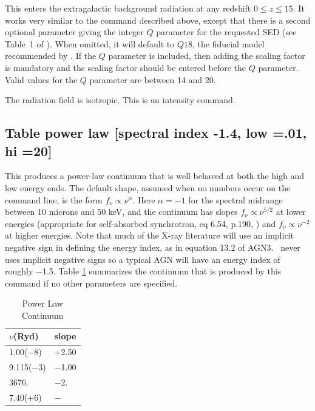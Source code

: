 This enters the \citet{KhaireSrianand2019} extragalactic background radiation
at any redshift $0 \le z \le 15$. It works very similar to the
 command described above, except that there is a second
optional parameter giving the integer $Q$ parameter for the requested SED (see
Table~1 of \citealp{KhaireSrianand2019}). When omitted, it will default to
$Q18$, the fiducial model recommended by \citet{KhaireSrianand2019}. If the
$Q$ parameter is included, then adding the scaling factor is mandatory and the
scaling factor should be entered before the $Q$ parameter. Valid values for
the $Q$ parameter are between 14 and 20.

The radiation field is isotropic. This is an intensity command.

\subsection{Table power law [spectral index -1.4, low =.01, hi =20] }

This produces a power-law continuum that is well behaved at both the
high and low energy ends.
The default shape, assumed when no numbers occur
on the command line, is the form $f_\nu   \propto \nu ^\alpha  $.
Here
$\alpha = -1$ for the spectral midrange between 10 microns and 50 keV,
and the continuum has slopes $f_\nu   \propto \nu ^{5/2} $ at lower energies (appropriate for self-absorbed synchrotron, eq 6.54,
p.190, \citealp{Rybicki1979}) and
$f_\nu   \propto \nu ^{ - 2} $ at higher energies.
Note that much of the X-ray literature will use
an implicit negative sign in defining the energy index,
as in equation 13.2 of AGN3.
\Cloudy\ never uses implicit negative signs so a typical AGN will
have an energy index of roughly $-$1.5.
Table \ref{tab:PowerLawContinuum} summarizes the continuum
that is produced by this command if no other parameters are specified.

\begin{table}
\centering
\caption{Power Law Continuum}
\begin{tabular}{ll}\hline
\label{tab:PowerLawContinuum}
$\nu$(Ryd)& slope\\
\hline
1.00($-$8)& $+$2.50\\
9.115($-$3)& $-$1.00\\
3676.& $-$2.\\
7.40($+$6)& $-$\\
\hline
\end{tabular}
\end{table}

